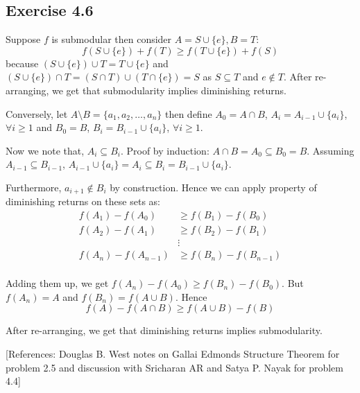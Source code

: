 \documentclass[12pt]{article}
\newcommand*{\union}{\cup}
\newcommand*{\inter}{\cap}
\begin{document}
\subsection*{Exercise 4.6}

Suppose $f$ is submodular then consider $A = S \cup \{e\}, B = T$:
$$f(S \cup \{e\}) + f(T) \geq f(T \cup \{e\}) + f(S)$$
because $(S \cup \{e\}) \cup T = T \cup \{e\}$ and $(S \cup \{e\}) \cap T = (S \cap T) \cup (T \cap \{e\}) = S$ as $S \subseteq T$ and $e \not \in T$. After re-arranging, we get that submodularity implies diminishing returns.
\newline

Conversely, let $A \setminus B = \{a_1, a_2, \ldots, a_n\}$ then define $A_0 = A \inter B$, $A_i = A_{i-1} \union \{a_i\}$, $\forall i \geq 1$ and $B_0 = B$, $B_i = B_{i-1} \union \{a_i\}$, $\forall i \geq 1$.

Now we note that, $A_i \subseteq B_i$. Proof by induction: $A \inter B = A_0 \subseteq B_0 = B$. Assuming $A_{i-1} \subseteq B_{i-1}$, $A_{i-1} \union \{a_i\} = A_i \subseteq B_i = B_{i-1} \union \{a_i\}$. 

Furthermore, $a_{i+1} \not \in B_i$ by construction. Hence we can apply property of diminishing returns on these sets as:
\begin{align*}
    f(A_1) - f(A_0) &\geq f(B_1) - f(B_0) \\
    f(A_2) - f(A_1) &\geq f(B_2) - f(B_1) \\
    &\vdots \\
    f(A_n) - f(A_{n-1}) &\geq f(B_n) - f(B_{n-1}) \\
\end{align*}

Adding them up, we get $f(A_n) - f(A_0) \geq f(B_n) - f(B_0)$. But $f(A_n) = A$ and $f(B_n) = f(A \cup B)$. Hence
$$f(A) - f(A \cap B) \geq f(A \cup B) - f(B)$$

After re-arranging, we get that diminishing returns implies submodularity.


\vspace{2in} %

[References: Douglas B. West notes on Gallai Edmonds Structure Theorem for problem 2.5 and discussion with Sricharan AR and Satya P. Nayak for problem 4.4]
\end{document}
